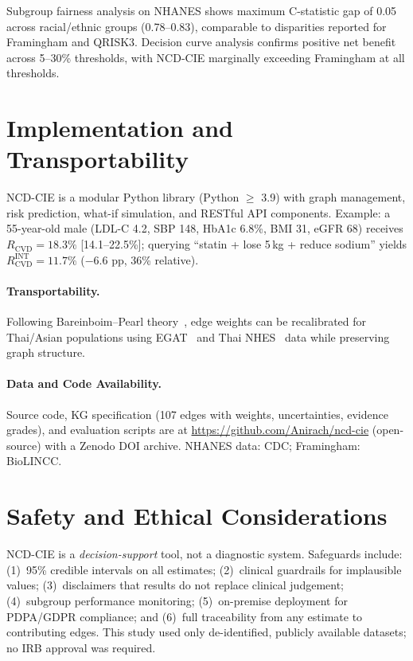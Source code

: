 \documentclass[runningheads]{llncs}
\begin{document}
Subgroup fairness analysis on NHANES shows maximum C-statistic gap of
0.05 across racial/ethnic groups (0.78--0.83), comparable to
disparities reported for Framingham and QRISK3.
Decision curve analysis confirms positive net benefit across
5--30\% thresholds, with NCD-CIE marginally exceeding Framingham
at all thresholds.

\section{Implementation and Transportability}\label{sec:impl}

NCD-CIE is a modular Python library (Python $\geq$ 3.9) with
graph management, risk prediction, what-if simulation, and RESTful
API components.
Example: a 55-year-old male (LDL-C 4.2, SBP 148, HbA1c 6.8\%, BMI
31, eGFR 68) receives $R_{\text{CVD}} = 18.3\%$ [14.1--22.5\%];
querying ``statin + lose 5\,kg + reduce sodium'' yields
$R_{\text{CVD}}^{\text{INT}} = 11.7\%$ ($-$6.6 pp, 36\% relative).

\paragraph{Transportability.}
Following Bareinboim--Pearl theory~\cite{bareinboim2016causal},
edge weights can be recalibrated for Thai/Asian populations using
EGAT~\cite{sritara2003egat} and Thai NHES~\cite{aekplakorn2011thai}
data while preserving graph structure.

\paragraph{Data and Code Availability.}
Source code, KG specification (107 edges with weights, uncertainties,
evidence grades), and evaluation scripts are at
\url{https://github.com/Anirach/ncd-cie} (open-source) with a
Zenodo DOI archive.
NHANES data: CDC; Framingham: BioLINCC.

\section{Safety and Ethical Considerations}\label{sec:ethics}

NCD-CIE is a \emph{decision-support} tool, not a diagnostic system.
Safeguards include: (1)~95\% credible intervals on all estimates;
(2)~clinical guardrails for implausible values;
(3)~disclaimers that results do not replace clinical judgement;
(4)~subgroup performance monitoring;
(5)~on-premise deployment for PDPA/GDPR compliance; and
(6)~full traceability from any estimate to contributing edges.
This study used only de-identified, publicly available datasets;
no IRB approval was required.
\end{document}

